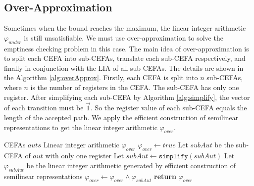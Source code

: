 \documentclass[runningheads]{llncs}
\newcommand*{\myvec}[1]{\vec{#1}}
\newcommand*{\algfun}[1]{\texttt{#1}}
\begin{document}
\subsection{Over-Approximation}
Sometimes when the bound reaches the maximum, the linear integer arithmetic $\varphi_{under}$ is still unsatisfiable. We must use over-approximation to solve the emptiness checking problem in this case. The main idea of over-approximation is to split each CEFA into sub-CEFAs, translate each sub-CEFA respectively, and finally in conjunction with the LIA of all sub-CEFAs. The details are shown in the Algorithm \ref{alg:overApprox}. Firstly, each CEFA is split into $n$ sub-CEFAs, where $n$ is the number of registers in the CEFA. The sub-CEFA has only one register. After simplifying each sub-CEFA by Algorithm \ref{alg:simplify}, the vector of each transition must be $\myvec{1}$. So the register value of each sub-CEFA equals the length of the accepted path. We apply the efficient construction of semilinear representations\cite{unary_nfa_2010} to get the linear integer arithmetic $\varphi_{over}$.
\begin{algorithm}
  \caption{$\algfun{overApprox}(auts)$}
  \label{alg:overApprox}
  \begin{algorithmic}[1]
    \Require CEFAs $auts$
    \Ensure Linear integer arithmetic $\varphi_{over}$
    \Statex
    \State $\varphi_{over} \gets true$
      \State Let $subAut$ be the sub-CEFA of $aut$ with only one register
      \State Let $subAut \gets \algfun{simplify}(subAut)$
      \State Let $\varphi_{subAut}$ be the linear integer arithmetic generated by efficient construction of semilinear representations
      \State $\varphi_{over} \gets \varphi_{over} \wedge \varphi_{subAut}$
    \EndFor
    \State \textbf{return} $\varphi_{over}$
  \end{algorithmic}
\end{algorithm}
\end{document}
